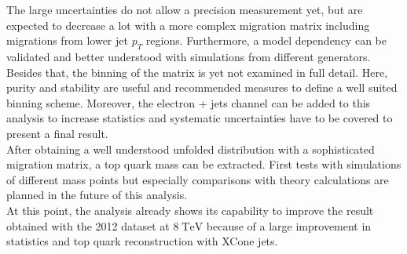	The large uncertainties do not allow a precision measurement yet, but are expected to decrease a lot with a more complex migration matrix including migrations from lower jet $p_T$ regions. Furthermore, a model dependency can be validated and better understood with simulations from different generators. Besides that, the binning of the matrix is yet not examined in full detail. Here, purity and stability are useful and recommended measures to define a well suited binning scheme. Moreover, the electron + jets channel can be added to this analysis to increase statistics and systematic uncertainties have to be covered to present a final result. \\
	After obtaining a well understood unfolded distribution with a sophisticated migration matrix, a top quark mass can be extracted. First tests with simulations of different mass points but especially comparisons with theory calculations are planned in the future of this analysis. \\
	At this point, the analysis already shows its capability to improve the result obtained with the 2012 dataset at $8\;\text{TeV}$ because of a large improvement in statistics and top quark reconstruction with XCone jets.
